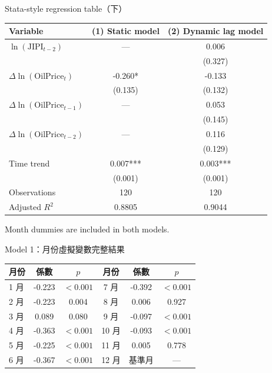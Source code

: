 \documentclass[aspectratio=169]{ctexbeamer}
\begin{document}
\begin{frame}{Stata-style regression table（下）}
\small
\setlength{\tabcolsep}{4pt}
\begin{tabular}{lcc}
\toprule
Variable & (1) Static model & (2) Dynamic lag model \\
\midrule
$\ln(\mathrm{JIPI}_{t-2})$ & --- & 0.006 \\
 &  & (0.327) \\
$\Delta \ln(\mathrm{OilPrice}_t)$ & -0.260* & -0.133 \\
 & (0.135) & (0.132) \\
$\Delta \ln(\mathrm{OilPrice}_{t-1})$ & --- & 0.053 \\
 &  & (0.145) \\
$\Delta \ln(\mathrm{OilPrice}_{t-2})$ & --- & 0.116 \\
 &  & (0.129) \\
Time trend & 0.007*** & 0.003*** \\
 & (0.001) & (0.001) \\
Observations & 120 & 120 \\
Adjusted $R^2$ & 0.8805 & 0.9044 \\
\bottomrule
\end{tabular}
\vspace{0.2em}

\scriptsize
Month dummies are included in both models.
\end{frame}

\begin{frame}{Model 1：月份虛擬變數完整結果}
\scriptsize
\begin{tabular}{lccccc}
\toprule
月份 & 係數 & $p$ & 月份 & 係數 & $p$ \\
\midrule
1 月 & -0.223 & $<0.001$ & 7 月 & -0.392 & $<0.001$ \\
2 月 & -0.223 & 0.004 & 8 月 & 0.006 & 0.927 \\
3 月 & 0.089 & 0.080 & 9 月 & -0.097 & $<0.001$ \\
4 月 & -0.363 & $<0.001$ & 10 月 & -0.093 & $<0.001$ \\
5 月 & -0.225 & $<0.001$ & 11 月 & 0.005 & 0.778 \\
6 月 & -0.367 & $<0.001$ & 12 月 & 基準月 & --- \\
\bottomrule
\end{tabular}
\end{frame}
\end{document}
